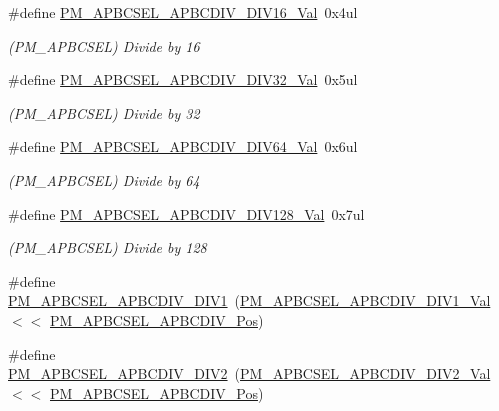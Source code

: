\begin{DoxyCompactItemize}
\#define \mbox{\hyperlink{group___s_a_m_d21___p_m_ga6fe64d54976c1ae20f5e280b0b70db29}{P\+M\+\_\+\+A\+P\+B\+C\+S\+E\+L\+\_\+\+A\+P\+B\+C\+D\+I\+V\+\_\+\+D\+I\+V16\+\_\+\+Val}}~0x4ul
\begin{DoxyCompactList}\small\item\em (P\+M\+\_\+\+A\+P\+B\+C\+S\+EL) Divide by 16 \end{DoxyCompactList}\item 
\#define \mbox{\hyperlink{group___s_a_m_d21___p_m_ga833c9559062ca281577ab653e32fc9a8}{P\+M\+\_\+\+A\+P\+B\+C\+S\+E\+L\+\_\+\+A\+P\+B\+C\+D\+I\+V\+\_\+\+D\+I\+V32\+\_\+\+Val}}~0x5ul
\begin{DoxyCompactList}\small\item\em (P\+M\+\_\+\+A\+P\+B\+C\+S\+EL) Divide by 32 \end{DoxyCompactList}\item 
\#define \mbox{\hyperlink{group___s_a_m_d21___p_m_ga4dc1ccebf7e7d88b71527d7b02c159e2}{P\+M\+\_\+\+A\+P\+B\+C\+S\+E\+L\+\_\+\+A\+P\+B\+C\+D\+I\+V\+\_\+\+D\+I\+V64\+\_\+\+Val}}~0x6ul
\begin{DoxyCompactList}\small\item\em (P\+M\+\_\+\+A\+P\+B\+C\+S\+EL) Divide by 64 \end{DoxyCompactList}\item 
\#define \mbox{\hyperlink{group___s_a_m_d21___p_m_ga77ed7791d99c862183da8cb58b349aca}{P\+M\+\_\+\+A\+P\+B\+C\+S\+E\+L\+\_\+\+A\+P\+B\+C\+D\+I\+V\+\_\+\+D\+I\+V128\+\_\+\+Val}}~0x7ul
\begin{DoxyCompactList}\small\item\em (P\+M\+\_\+\+A\+P\+B\+C\+S\+EL) Divide by 128 \end{DoxyCompactList}\item 
\#define \mbox{\hyperlink{group___s_a_m_d21___p_m_gad92a05127b3c70675bdaecd01e30c335}{P\+M\+\_\+\+A\+P\+B\+C\+S\+E\+L\+\_\+\+A\+P\+B\+C\+D\+I\+V\+\_\+\+D\+I\+V1}}~(\mbox{\hyperlink{group___s_a_m_d21___p_m_ga765ff4e686958dbc7632b65e5f41e194}{P\+M\+\_\+\+A\+P\+B\+C\+S\+E\+L\+\_\+\+A\+P\+B\+C\+D\+I\+V\+\_\+\+D\+I\+V1\+\_\+\+Val}}   $<$$<$ \mbox{\hyperlink{group___s_a_m_d21___p_m_ga4a8379c87e542ce1f35e688187aac873}{P\+M\+\_\+\+A\+P\+B\+C\+S\+E\+L\+\_\+\+A\+P\+B\+C\+D\+I\+V\+\_\+\+Pos}})
\item 
\#define \mbox{\hyperlink{group___s_a_m_d21___p_m_ga1cc5c4bacd42d159467e5d18c246b244}{P\+M\+\_\+\+A\+P\+B\+C\+S\+E\+L\+\_\+\+A\+P\+B\+C\+D\+I\+V\+\_\+\+D\+I\+V2}}~(\mbox{\hyperlink{group___s_a_m_d21___p_m_ga5851df079a899ab86eeacb5ea31a5f0b}{P\+M\+\_\+\+A\+P\+B\+C\+S\+E\+L\+\_\+\+A\+P\+B\+C\+D\+I\+V\+\_\+\+D\+I\+V2\+\_\+\+Val}}   $<$$<$ \mbox{\hyperlink{group___s_a_m_d21___p_m_ga4a8379c87e542ce1f35e688187aac873}{P\+M\+\_\+\+A\+P\+B\+C\+S\+E\+L\+\_\+\+A\+P\+B\+C\+D\+I\+V\+\_\+\+Pos}})

\end{DoxyCompactItemize}
